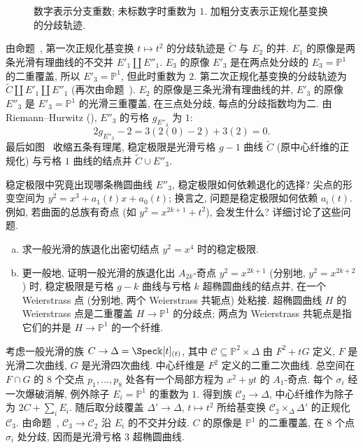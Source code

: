 \begin{figure}[H]\centering
\caption{数字表示分支重数; 未标数字时重数为 $1$. 加粗分支表示正规化基变换的分歧轨迹.}\label{src:6.5.14}
\end{figure}
由命题~, 第一次正规化基变换 $t\mapsto t^2$ 的分歧轨迹是 $\widetilde C$ 与 $E_2$ 的并. $E_1$ 的原像是两条光滑有理曲线的不交并 $E'_1\amalg E''_1$. $E_3$ 的原像 $E'_3$ 是在两点处分歧的 $E_3=\mathbb P^1$ 的二重覆盖, 所以 $E'_3=\mathbb P^1$, 但此时重数为 $2$. 第二次正规化基变换的分歧轨迹为 $\widetilde C\amalg E'_1\amalg E''_1$ (再次由命题~). $E_2$ 的原像是三条光滑有理曲线的并, $E'_3$ 的原像 $E''_3$ 是 $E'_3=\mathbb P^1$ 的光滑三重覆盖, 在三点处分歧, 每点的分歧指数均为二. 由 Riemann--Hurwitz (), $E''_3$ 的亏格 $g_{E''_3}$ 为 $1$:
\[
2g_{E''_3}-2=3(2(0)-2)+3(2)=0.
\]
最后如图~ 收缩五条有理尾, 稳定极限是光滑亏格 $g-1$ 曲线 $\widetilde C$ (原中心纤维的正规化) 与亏格 $1$ 曲线的结点并 $\widetilde C\cup E''_3$.
\begin{remark}\label{src:6.5.15}
稳定极限中究竟出现哪条椭圆曲线 $E''_3$, 稳定极限如何依赖退化的选择? 尖点的形变空间为 $y^2=x^3+a_1(t)x+a_0(t)$; 换言之, 问题是稳定极限如何依赖 $a_i(t)$. 例如, 若曲面的总族有奇点 (如 $y^2=x^{2k+1}+t^2$), 会发生什么? \cite[\S3.C]{HM98} 详细讨论了这些问题.
\end{remark}
\newpage
\begin{exercise}[很好的练习]\label{src:6.5.16}
\begin{enumerate}[(a)]
\item 求一般光滑的族退化出密切结点 $y^2=x^4$ 时的稳定极限.
\item 更一般地, 证明一般光滑的族退化出 $A_{2k}$-奇点 $y^2=x^{2k+1}$ (分别地, $y^2=x^{2k+2}$) 时, 稳定极限是亏格 $g-k$ 曲线与亏格 $k$ 超椭圆曲线的结点并, 在一个 Weierstrass 点 (分别地, 两个 Weierstrass 共轭点) 处粘接. 超椭圆曲线 $H$ 的 Weierstrass 点是二重覆盖 $H\to\mathbb P^1$ 的分歧点; 两点为 Weierstrass 共轭点是指它们的并是 $H\to\mathbb P^1$ 的一个纤维.
\end{enumerate}
\end{exercise}
\begin{example}[二重二次曲线的稳定约化]\label{src:6.5.17}
考虑一般光滑的族 $\mathcal C\to\Delta=\Spec\Bbbk[t]_{(t)}$, 其中 $\mathcal C\subseteq\mathbb P^2\times\Delta$ 由 $F^2+tG$ 定义, $F$ 是光滑二次曲线, $G$ 是光滑四次曲线. 中心纤维是 $F^2$ 定义的二重二次曲线. 总空间在 $F\cap G$ 的 $8$ 个交点 $p_1,\allowbreak \ldots,\allowbreak p_8$ 处各有一个局部方程为 $x^2+yt$ 的 $A_1$-奇点. 每个 $\sigma_i$ 经一次爆破消解, 例外除子 $E_i=\mathbb P^1$ 的重数为 $1$. 得到族 $\mathcal C_2\to\Delta$, 中心纤维作为除子为 $2C+\sum_iE_i$. 随后取分歧覆盖 $\Delta'\to\Delta$, $t\mapsto t^2$ 所给基变换 $\mathcal C_2\times_\Delta\Delta'$ 的正规化 $\mathcal C_3$. 由命题~, $\mathcal C_3\to\mathcal C_2$ 沿 $E_i$ 的不交并分歧. $C$ 的原像是 $\mathbb P^1$ 的二重覆盖, 在 $8$ 个点 $\sigma_i$ 处分歧, 因而是光滑亏格 $3$ 超椭圆曲线.
\end{example}

